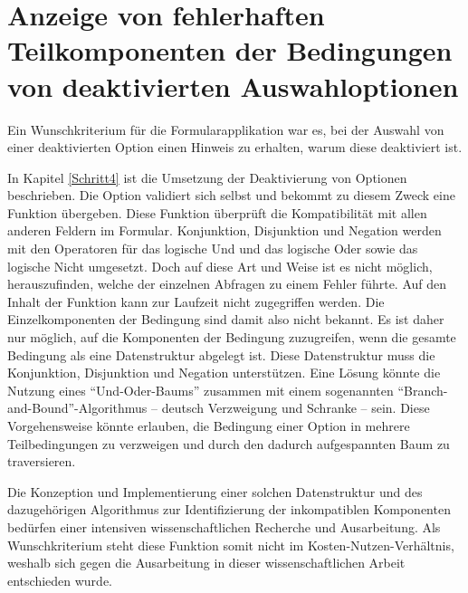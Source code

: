 \section{Anzeige von fehlerhaften Teilkomponenten der Bedingungen von deaktivierten Auswahloptionen}
\label{sec:Anzeige-von-fehlerhaften-Teilkomponenten-der-Bedingungen-von-deaktivierten-Auswahloptionen}


Ein Wunschkriterium für die Formularapplikation war es,
bei der Auswahl von einer deaktivierten Option einen Hinweis zu erhalten,
warum diese deaktiviert ist.

In Kapitel \ref{Schritt4} ist die Umsetzung der Deaktivierung von Optionen beschrieben.
Die Option validiert sich selbst und bekommt zu diesem Zweck eine Funktion übergeben. Diese Funktion überprüft die Kompatibilität mit allen anderen Feldern im Formular.
Konjunktion, Disjunktion und Negation werden mit den Operatoren für das logische Und und das logische Oder sowie das logische Nicht umgesetzt.
Doch auf diese Art und Weise ist es nicht möglich,
herauszufinden,
welche der einzelnen Abfragen zu einem Fehler führte.
Auf den Inhalt der Funktion kann zur Laufzeit nicht zugegriffen werden.
Die Einzelkomponenten der Bedingung sind damit also nicht bekannt. 
Es ist daher nur möglich,
auf die Komponenten der Bedingung zuzugreifen,
wenn die gesamte Bedingung als eine Datenstruktur abgelegt ist.
Diese Datenstruktur muss die Konjunktion, Disjunktion und Negation unterstützen.
Eine Lösung könnte die Nutzung eines \enquote{Und-Oder-Baums} zusammen mit einem sogenannten \enquote{Branch-and-Bound}-Algorithmus -- deutsch Verzweigung und Schranke -- sein.
Diese Vorgehensweise könnte erlauben, die Bedingung einer Option in mehrere Teilbedingungen zu verzweigen und durch den dadurch aufgespannten Baum zu traversieren. 


Die Konzeption und Implementierung einer solchen Datenstruktur und des dazugehörigen Algorithmus zur Identifizierung der inkompatiblen Komponenten bedürfen einer intensiven wissenschaftlichen Recherche und Ausarbeitung.
Als Wunschkriterium steht diese Funktion somit nicht im Kosten-Nutzen-Verhältnis, weshalb sich gegen die Ausarbeitung in dieser wissenschaftlichen Arbeit entschieden wurde.

